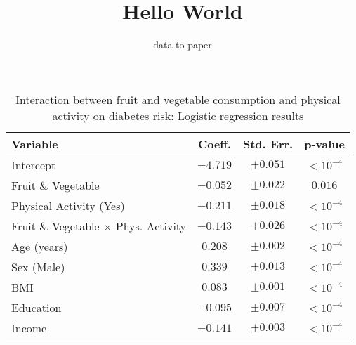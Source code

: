 \documentclass[12pt]{article}
\title{Hello World}
\author{data-to-paper}
\begin{document}
\maketitle

\begin{table}[!htbp]
\centering
\caption{Interaction between fruit and vegetable consumption and physical activity on diabetes risk: Logistic regression results}
\label{table3}
\begin{tabular}{l c c c}
\toprule
\textbf{Variable}                        & \textbf{Coeff.} & \textbf{Std. Err.} & \textbf{p-value} \\
\midrule
Intercept                                & $-4.719$       & $\pm 0.051$        & $<10^{-4}$    \\
Fruit \& Vegetable                      & $-0.052$       & $\pm 0.022$        & $0.016$       \\
Physical Activity (Yes)                  & $-0.211$       & $\pm 0.018$        & $<10^{-4}$    \\
Fruit \& Vegetable $\times$ Phys. Activity & $-0.143$       & $\pm 0.026$        & $<10^{-4}$    \\
Age (years)                              & $0.208$        & $\pm 0.002$        & $<10^{-4}$    \\
Sex (Male)                               & $0.339$        & $\pm 0.013$        & $<10^{-4}$    \\
BMI                                      & $0.083$        & $\pm 0.001$        & $<10^{-4}$    \\
Education                                & $-0.095$       & $\pm 0.007$        & $<10^{-4}$    \\
Income                                   & $-0.141$       & $\pm 0.003$        & $<10^{-4}$    \\
\bottomrule
\end{tabular}
\end{table}
\end{document}
